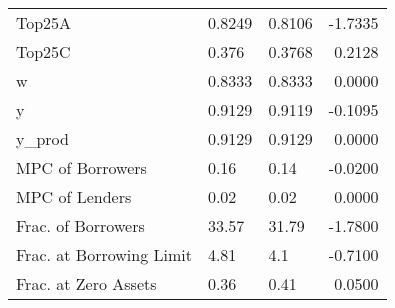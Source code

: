 \begin{table}
\begin{tabular}{lllr}
                  Top25A &  0.8249 &   0.8106 & -1.7335 \\
                  Top25C &   0.376 &   0.3768 &  0.2128 \\
                       w &  0.8333 &   0.8333 &  0.0000 \\
                       y &  0.9129 &   0.9119 & -0.1095 \\
                  y\_prod &  0.9129 &   0.9129 &  0.0000 \\
        MPC of Borrowers &    0.16 &     0.14 & -0.0200 \\
          MPC of Lenders &    0.02 &     0.02 &  0.0000 \\
      Frac. of Borrowers &   33.57 &    31.79 & -1.7800 \\
Frac. at Borrowing Limit &    4.81 &      4.1 & -0.7100 \\
    Frac. at Zero Assets &    0.36 &     0.41 &  0.0500 \\
\bottomrule
\end{tabular}
\end{table}

